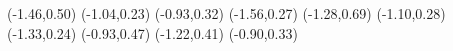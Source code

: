 \psdot[](-1.46,0.50)
\psdot[](-1.04,0.23)
\psdot[](-0.93,0.32)
\psdot[](-1.56,0.27)
\psdot[](-1.28,0.69)
\psdot[](-1.10,0.28)
\psdot[](-1.33,0.24)
\psdot[](-0.93,0.47)
\psdot[](-1.22,0.41)
\psdot[](-0.90,0.33)
